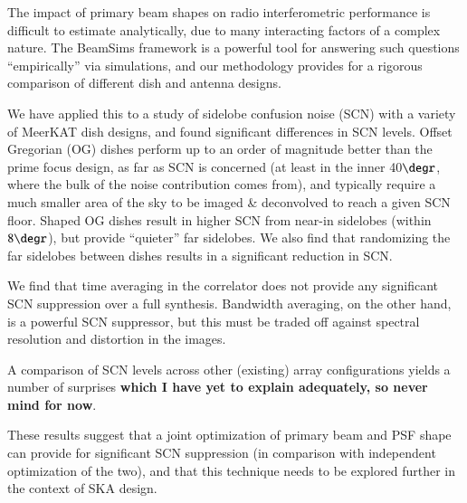 \documentclass{aa}
\begin{document}
The impact of primary beam shapes on radio interferometric performance is difficult to estimate analytically, due to many interacting factors of a complex nature. The BeamSims framework is a powerful tool for answering such questions ``empirically'' via simulations, and our methodology provides for a rigorous comparison of different dish and antenna designs.

We have applied this to a study of sidelobe confusion noise (SCN) with a variety of MeerKAT dish designs, and found significant differences in SCN levels. Offset Gregorian (OG) dishes perform up to an order of magnitude better than the prime focus design, as far as SCN is concerned (at least in the inner 40$\degr$, where the bulk of the noise contribution comes from), and typically require a much smaller area of the sky to be imaged \& deconvolved to reach a given SCN floor. Shaped OG dishes result in higher SCN from near-in sidelobes (within $8\degr$), but provide ``quieter'' far sidelobes. We also find that randomizing the far sidelobes between dishes results in a significant reduction in SCN.

We find that time averaging in the correlator does not provide any significant SCN suppression over a full synthesis. Bandwidth averaging, on the other hand, is a powerful SCN suppressor, but this must be traded off against spectral resolution and distortion in the images.

A comparison of SCN levels across other (existing) array configurations yields a number of surprises {\bf which I have yet to explain adequately, so never mind for now}.

These results suggest that a joint optimization of primary beam and PSF shape can provide for significant SCN suppression (in comparison with independent optimization of the two), and that this technique needs to be explored further in the context of SKA design.





\end{document}
